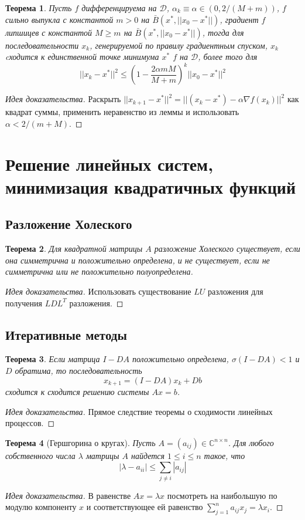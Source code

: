 \documentclass[10pt,a4paper]{article}
\newtheorem{theorem_ru}{Теорема}[section]
\newenvironment{sketch}
    {\begin{proof}[Идея доказательства]
    }
    { 
    \end{proof}
    }
\begin{document}
\begin{theorem_ru}
Пусть $f$ дифференцируема на $\mathcal{D}$, $\alpha_k\equiv \alpha\in (0, 2/(M+m))$, $f$ сильно выпукла с константой $m>0$ на 
$\bar{B}(x^*, ||x_0-x^*||)$, градиент $f$ липшицев с константой $M\geq m$ на $\bar{B}(x^*, ||x_0-x^*||)$, тогда для последовательности $x_k$, генерируемой по правилу градиентным спуском,
$x_k$ cходится к единственной точке минимума $x^*$ $f$ на $\mathcal{D}$, более того для 
$$
||x_k-x^*||^2\leq \left(1-\frac{2\alpha mM}{M+m}\right)^k||x_0-x^*||^2
$$
\end{theorem_ru}

\begin{sketch}
Раскрыть $||x_{k+1}-x^*||^2=||(x_k-x^*)-\alpha\nabla f(x_k)||^2$ как квадрат суммы, применить неравенство из леммы и использовать $\alpha<2/(m+M)$.
\end{sketch}

\section{Решение линейных систем, минимизация квадратичных функций}
\subsection{Разложение Холеского}
\begin{theorem_ru}
Для квадратной матрицы $A$ разложение Холеского существует, если она симметрична и положительно определена, и не существует, если не симметрична или не положительно полуопределена.
\end{theorem_ru}
\begin{sketch}
Использовать существование $LU$ разложения для получения $LDL^T$ разложения.
\end{sketch}

\subsection{Итеративные методы}
\begin{theorem_ru}
Если матрица $I-DA$ положительно определена, $\sigma(I-DA)<1$ и $D$ обратима, то последовательность 
$$
x_{k+1}=(I-DA)x_k+Db
$$
сходится к сходится решению системы $Ax=b$.
\end{theorem_ru}
\begin{sketch}
Прямое следствие теоремы о сходимости линейных процессов.
\end{sketch}

\begin{theorem_ru}[Гершгорина о кругах]
Пусть $A=(a_{ij})\in \mathbb{C}^{n\times n}$. Для любого собственного числа $\lambda$ матрицы $A$ найдется $1\leq i\leq n$ такое, что
$$
|\lambda-a_{ii}|\leq \sum_{j\neq i}|a_{ij}|
$$
\end{theorem_ru}
\begin{sketch}
В равенстве $Ax=\lambda x$ посмотреть на наибольшую по модулю компоненту $x$ и соответствующее ей равенство $\sum_{j=1}^na_{ij}x_j=\lambda x_i$.
\end{sketch}
\end{document}
